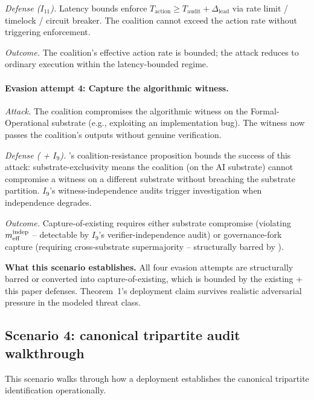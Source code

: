 \emph{Defense ($I_{11}$).}  Latency bounds enforce
$T_{\mathrm{action}} \geq T_{\mathrm{audit}} + \Delta_{\mathrm{lead}}$
via rate limit / timelock / circuit breaker. The coalition cannot
exceed the action rate without triggering enforcement.

\emph{Outcome.}  The coalition's effective action rate is bounded;
the attack reduces to ordinary execution within the latency-bounded
regime.

\paragraph{Evasion attempt 4: Capture the algorithmic witness.}

\emph{Attack.}  The coalition compromises the algorithmic witness
on the Formal-Operational substrate (e.g., exploiting an
implementation bug). The witness now passes the coalition's outputs
without genuine verification.

\emph{Defense (\citep[Exogenous~Verification]{lasser2026exo} + $I_9$).}  \citep[Exogenous~Verification]{lasser2026exo}'s coalition-resistance
proposition bounds the success of this attack: substrate-exclusivity
means the coalition (on the AI substrate) cannot compromise a
witness on a different substrate without breaching the substrate
partition. $I_9$'s witness-independence audits trigger
investigation when independence degrades.

\emph{Outcome.}  Capture-of-existing requires either substrate
compromise (violating $m_{\mathrm{eff}}^{\mathrm{indep}}$ -- detectable by $I_9$'s
verifier-independence audit) or governance-fork capture (requiring
cross-substrate supermajority -- structurally barred by \citep[Exogenous~Verification]{lasser2026exo}).

\textbf{What this scenario establishes.}  All four evasion attempts
are structurally barred or converted into capture-of-existing,
which is bounded by the existing \citep[Exogenous~Verification]{lasser2026exo} + this paper defenses.
Theorem~1's deployment claim survives realistic adversarial pressure
in the modeled threat class.

\subsection{Scenario 4: canonical tripartite audit walkthrough}
\label{sec:scenario_audit}

This scenario walks through how a deployment establishes the
canonical tripartite identification operationally.

